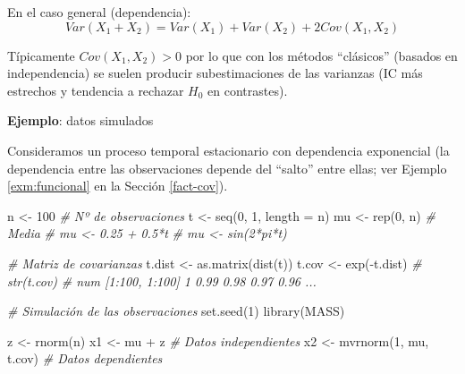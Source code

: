 \documentclass[
]{book}
\newenvironment{Shaded}{\begin{snugshade}}{\end{snugshade}}
\newcommand{\AttributeTok}[1]{\textcolor[rgb]{0.77,0.63,0.00}{#1}}
\newcommand{\CommentTok}[1]{\textcolor[rgb]{0.56,0.35,0.01}{\textit{#1}}}
\newcommand{\DecValTok}[1]{\textcolor[rgb]{0.00,0.00,0.81}{#1}}
\newcommand{\FunctionTok}[1]{\textcolor[rgb]{0.00,0.00,0.00}{#1}}
\newcommand{\NormalTok}[1]{#1}
\newcommand{\OtherTok}[1]{\textcolor[rgb]{0.56,0.35,0.01}{#1}}
\newcommand{\SpecialCharTok}[1]{\textcolor[rgb]{0.00,0.00,0.00}{#1}}
\theoremstyle{break}
\theoremstyle{definition}
\theoremstyle{definition}
\theoremstyle{definition}
\theoremstyle{definition}
\theoremstyle{remark}
\begin{document}
En el caso general (dependencia):
\[Var(X_{1}+X_{2})=Var(X_{1})+Var(X_{2})+2Cov(X_{1},X_{2})\]

Típicamente \(Cov(X_{1},X_{2})>0\) por lo que con los métodos
``clásicos'' (basados en independencia) se suelen producir
subestimaciones de las varianzas (IC más estrechos y tendencia a
rechazar \(H_{0}\) en contrastes).

\textbf{Ejemplo}: datos simulados

Consideramos un proceso temporal estacionario con dependencia exponencial
(la dependencia entre las observaciones depende del ``salto'' entre ellas;
ver Ejemplo \ref{exm:funcional} en la Sección \ref{fact-cov}).

\begin{Shaded}
\begin{Highlighting}[]
\NormalTok{n }\OtherTok{\textless{}{-}} \DecValTok{100}          \CommentTok{\# Nº de observaciones}
\NormalTok{t }\OtherTok{\textless{}{-}} \FunctionTok{seq}\NormalTok{(}\DecValTok{0}\NormalTok{, }\DecValTok{1}\NormalTok{, }\AttributeTok{length =}\NormalTok{ n)}
\NormalTok{mu }\OtherTok{\textless{}{-}} \FunctionTok{rep}\NormalTok{(}\DecValTok{0}\NormalTok{, n)   }\CommentTok{\# Media}
\CommentTok{\# mu \textless{}{-} 0.25 + 0.5*t}
\CommentTok{\# mu \textless{}{-} sin(2*pi*t)}

\CommentTok{\# Matriz de covarianzas}
\NormalTok{t.dist }\OtherTok{\textless{}{-}} \FunctionTok{as.matrix}\NormalTok{(}\FunctionTok{dist}\NormalTok{(t))}
\NormalTok{t.cov }\OtherTok{\textless{}{-}} \FunctionTok{exp}\NormalTok{(}\SpecialCharTok{{-}}\NormalTok{t.dist)}
\CommentTok{\# str(t.cov)}
\CommentTok{\# num [1:100, 1:100] 1 0.99 0.98 0.97 0.96 ...}

\CommentTok{\# Simulación de las observaciones}
\FunctionTok{set.seed}\NormalTok{(}\DecValTok{1}\NormalTok{)}
\FunctionTok{library}\NormalTok{(MASS)}

\NormalTok{z }\OtherTok{\textless{}{-}} \FunctionTok{rnorm}\NormalTok{(n)}
\NormalTok{x1 }\OtherTok{\textless{}{-}}\NormalTok{ mu }\SpecialCharTok{+}\NormalTok{ z }\CommentTok{\# Datos independientes}
\NormalTok{x2 }\OtherTok{\textless{}{-}} \FunctionTok{mvrnorm}\NormalTok{(}\DecValTok{1}\NormalTok{, mu, t.cov) }\CommentTok{\# Datos dependientes}


\end{Highlighting}
\end{Shaded}
\end{document}
